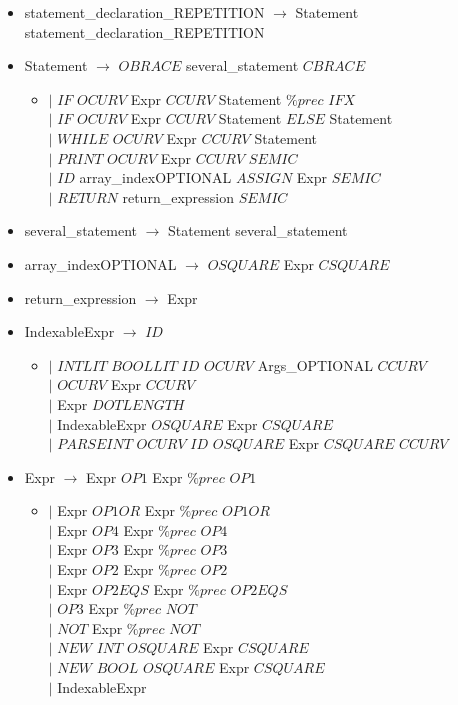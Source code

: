 \documentclass[12pt]{article}
\begin{document}
\begin{itemize}
  \item[] statement\_declaration\_REPETITION $\longrightarrow$ Statement statement\_declaration\_REPETITION
  \\
  \item[] Statement $\longrightarrow$ $OBRACE$ several\_statement $CBRACE$
  \begin{itemize}
  \item[]$|$ $IF$ $OCURV$ Expr $CCURV$ Statement $\%prec$ $IFX$ 
  \\$|$ $IF$ $OCURV$ Expr $CCURV$ Statement $ELSE$ Statement 
  \\$|$ $WHILE$ $OCURV$ Expr $CCURV$ Statement 
  \\$|$ $PRINT$ $OCURV$ Expr $CCURV$ $SEMIC$ 
  \\$|$ $ID$ array\_indexOPTIONAL $ASSIGN$ Expr $SEMIC$ 
  \\$|$ $RETURN$ return\_expression $SEMIC$  
    \end{itemize}
  
  \item[] several\_statement $\longrightarrow$ Statement several\_statement  
  \\
  \item[] array\_indexOPTIONAL $\longrightarrow$  $OSQUARE$ Expr $CSQUARE$
  \\
  \item[] return\_expression $\longrightarrow$  Expr
  \\
  \item[] IndexableExpr $\longrightarrow$ $ID$ 
  \begin{itemize}
  \item[]$|$ $INTLIT$ $BOOLLIT$ $ID$ $OCURV$ Args\_OPTIONAL $CCURV$ 
  \\$|$ $OCURV$ Expr $CCURV$ 
  \\$|$ Expr $DOTLENGTH$ 
  \\$|$ IndexableExpr $OSQUARE$ Expr $CSQUARE$ 
  \\$|$ $PARSEINT$ $OCURV$ $ID$ $OSQUARE$ Expr $CSQUARE$ $CCURV$
    \end{itemize}

  \item[] Expr $\longrightarrow$ Expr $OP1$ Expr $\%prec$ $OP1$ 
  \begin{itemize}
		\item[] $|$      Expr $OP1OR$ Expr $\%prec$ $OP1OR$
		\\$|$ Expr $OP4$ Expr $\%prec$ $OP4$ 
		\\$|$ Expr $OP3$ Expr $\%prec$ $OP3$  
		\\$|$ Expr $OP2$ Expr $\%prec$ $OP2$ 
		\\$|$ Expr $OP2EQS$ Expr $\%prec$ $OP2EQS$
		\\$|$ $OP3$ Expr $\%prec$ $NOT$
		\\$|$ $NOT$ Expr $\%prec$ $NOT$
		\\$|$ $NEW$ $INT$ $OSQUARE$ Expr $CSQUARE$
		\\$|$ $NEW$ $BOOL$ $OSQUARE$ Expr $CSQUARE$
		\\$|$ IndexableExpr
  \end{itemize}


\end{itemize}
\end{document}
